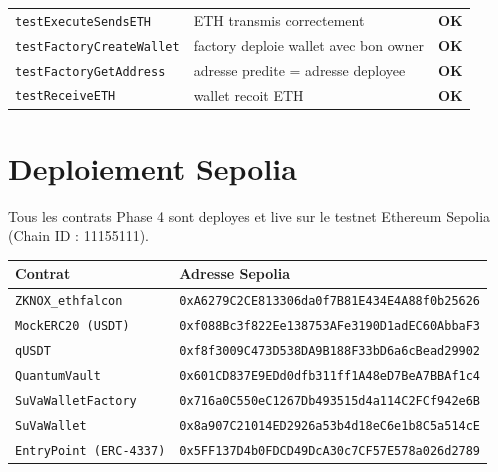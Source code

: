 \documentclass[11pt,a4paper]{article}
\begin{document}
\begin{center}
\begin{tabular}{llc}
\texttt{testExecuteSendsETH}              & ETH transmis correctement                      & \textcolor{pass-green}{\textbf{OK}} \\
\texttt{testFactoryCreateWallet}          & factory deploie wallet avec bon owner          & \textcolor{pass-green}{\textbf{OK}} \\
\texttt{testFactoryGetAddress}            & adresse predite = adresse deployee             & \textcolor{pass-green}{\textbf{OK}} \\
\texttt{testReceiveETH}                   & wallet recoit ETH                              & \textcolor{pass-green}{\textbf{OK}} \\
\bottomrule
\end{tabular}
\end{center}

\section{Deploiement Sepolia}

Tous les contrats Phase 4 sont deployes et live sur le testnet Ethereum Sepolia (Chain ID : 11155111).

\begin{center}
\begin{tabular}{ll}
\toprule
\textbf{Contrat} & \textbf{Adresse Sepolia} \\
\midrule
\texttt{ZKNOX\_ethfalcon}      & \texttt{0xA6279C2CE813306da0f7B81E434E4A88f0b25626} \\
\texttt{MockERC20 (USDT)}      & \texttt{0xf088Bc3f822Ee138753AFe3190D1adEC60AbbaF3} \\
\texttt{qUSDT}                 & \texttt{0xf8f3009C473D538DA9B188F33bD6a6cBead29902} \\
\texttt{QuantumVault}          & \texttt{0x601CD837E9EDd0dfb311ff1A48eD7BeA7BBAf1c4} \\
\texttt{SuVaWalletFactory}     & \texttt{0x716a0C550eC1267Db493515d4a114C2FCf942e6B} \\
\texttt{SuVaWallet}            & \texttt{0x8a907C21014ED2926a53b4d18eC6e1b8C5a514cE} \\
\texttt{EntryPoint (ERC-4337)} & \texttt{0x5FF137D4b0FDCD49DcA30c7CF57E578a026d2789} \\
\bottomrule
\end{tabular}
\end{center}
\end{document}
